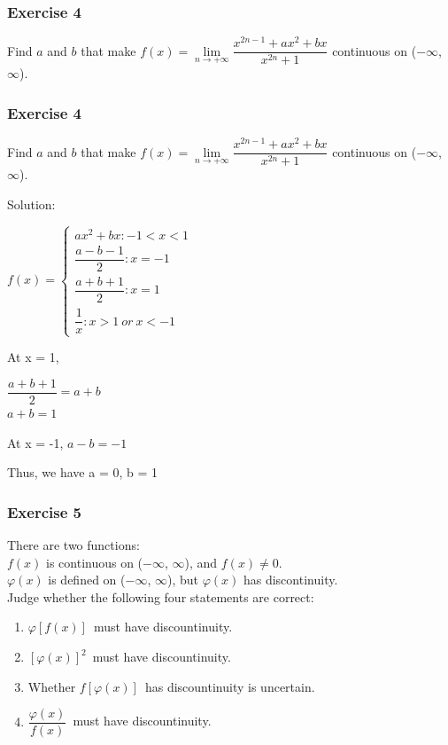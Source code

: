 \documentclass{beamer}
\begin{document}
	\begin{frame}
		\frametitle{Exercise 4}
		Find $a$ and $b$ that make $f(x) = \lim\limits_{\textit{n} \to +\infty}\dfrac{x^{2n - 1} + ax^{2} + bx}{x^{2n} + 1}$ continuous on ($-\infty$, $\infty$).
	\end{frame}
	
	\begin{frame}
		\frametitle{Exercise 4}
		Find $a$ and $b$ that make $f(x) = \lim\limits_{\textit{n} \to +\infty}\dfrac{x^{2n - 1} + ax^{2} + bx}{x^{2n} + 1}$ continuous on ($-\infty$, $\infty$).
		
		Solution:
		
		$f(x) = \begin{cases}
					ax^2 + bx: -1<x<1\\
					\dfrac{a-b-1}{2}: x = -1\\
					\dfrac{a+b+1}{2}: x = 1\\
					\dfrac{1}{x}: x>1 \ or\  x<-1
				\end{cases}$
				
		At x = 1, 
		\begin{cases}
		$\dfrac{a+b+1}{2} = a+b$\\
		$a+b = 1$
		\end{cases}
		
		At x = -1,
		$a - b = -1$
		
		Thus, we have a = 0, b = 1
		
	\end{frame}

	\begin{frame}
		\frametitle{Exercise 5}
		There are two functions:\\
		$f(x)$ is continuous on ($-\infty$, $\infty$), and $f(x) \neq 0$.\\ 
		$\varphi (x)$ is defined on ($-\infty$, $\infty$), but $\varphi (x)$ has discontinuity.\\
		\bigskip
		Judge whether the following four statements are correct:
		\begin{enumerate}
			\item $\varphi [f(x)]$\ must have discountinuity.
			\item $[\varphi (x)]^{2}$\ must have discountinuity.
			\item Whether $f[\varphi (x)]$\ has discountinuity is uncertain.
			\item $\dfrac{\varphi (x)}{f(x)}$\ must have discountinuity.
		\end{enumerate}
	\end{frame}
	
\end{document}
